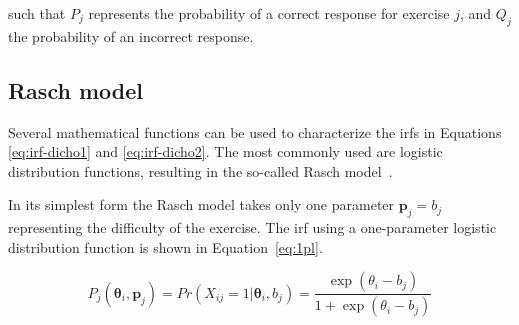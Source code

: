 such that $P_{j}$ represents the probability of a correct response for exercise $j$, and $Q_j$ the probability of an incorrect response.

\subsection{Rasch model}
\label{sec:rasch}
Several mathematical functions can be used to characterize the \glspl{irf} in Equations \ref{eq:irf-dicho1} and \ref{eq:irf-dicho2}.
The most commonly used are logistic distribution functions, resulting in the so-called Rasch model~\cite{rasch1960probabilistic}.



In its simplest form the Rasch model takes only one parameter $\bm{p}_j = b_j$ representing the difficulty of the exercise. 
The \gls{irf} using a one-parameter logistic distribution function is shown in Equation~\ref{eq:1pl}.

\begin{equation}
    \label{eq:1pl}
    P_{j}(\bm{\theta}_i,\bm{p}_j) =
    Pr(X_{ij} = 1 | \bm{\theta}_i,b_j) =
    \frac{\exp(\theta_i - b_j)}{1 + \exp(\theta_i - b_j)}
\end{equation}

